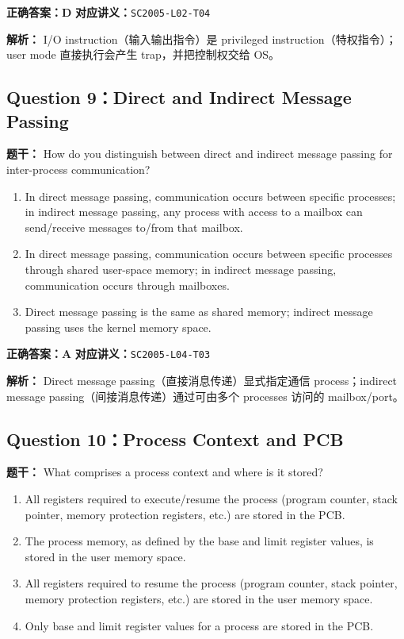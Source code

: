 \documentclass[11pt,a4paper,fontset=fandol]{ctexart}
\renewcommand{\exercisequestion}[2]{%
  \Needspace{5\baselineskip}%
  \subsection{#2}\label{exercise:#1}%
}
\renewenvironment{checkedsolution}
  {\par\nopagebreak[4]\textbf{解析：}\ignorespaces}
  {\par}
\begin{document}
\textbf{正确答案：D}\qquad
\textbf{对应讲义：}\texttt{SC2005-L02-T04}

\begin{checkedsolution}
I/O instruction（输入输出指令）是 privileged instruction（特权指令）；user mode 直接执行会产生 trap，并把控制权交给 OS。
\end{checkedsolution}

\exercisequestion{SC2005-HW01-Q09}{Question 9：Direct and Indirect Message Passing}

\textbf{题干：} How do you distinguish between direct and indirect message passing for inter-process communication?

\begin{enumerate}[label=\Alph*.,leftmargin=2.4em]
  \item In direct message passing, communication occurs between specific processes; in indirect message passing, any process with access to a mailbox can send/receive messages to/from that mailbox.
  \item In direct message passing, communication occurs between specific processes through shared user-space memory; in indirect message passing, communication occurs through mailboxes.
  \item Direct message passing is the same as shared memory; indirect message passing uses the kernel memory space.
\end{enumerate}

\textbf{正确答案：A}\qquad
\textbf{对应讲义：}\texttt{SC2005-L04-T03}

\begin{checkedsolution}
Direct message passing（直接消息传递）显式指定通信 process；indirect message passing（间接消息传递）通过可由多个 processes 访问的 mailbox/port。
\end{checkedsolution}

\exercisequestion{SC2005-HW01-Q10}{Question 10：Process Context and PCB}

\textbf{题干：} What comprises a process context and where is it stored?

\begin{enumerate}[label=\Alph*.,leftmargin=2.4em]
  \item All registers required to execute/resume the process (program counter, stack pointer, memory protection registers, etc.) are stored in the PCB.
  \item The process memory, as defined by the base and limit register values, is stored in the user memory space.
  \item All registers required to resume the process (program counter, stack pointer, memory protection registers, etc.) are stored in the user memory space.
  \item Only base and limit register values for a process are stored in the PCB.
\end{enumerate}
\end{document}
